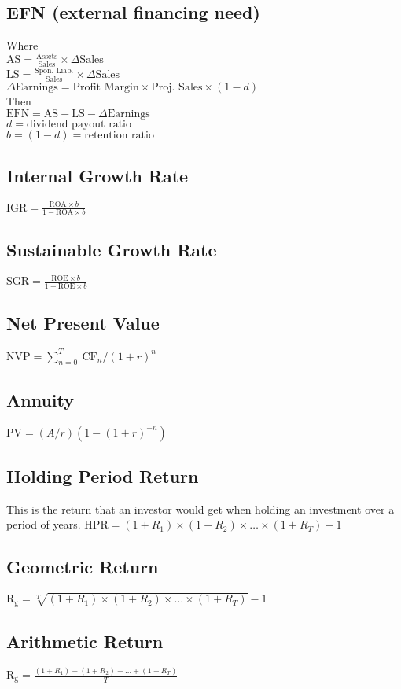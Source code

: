 \subsection{EFN (external financing need)}
Where \\
$\mathrm{AS} = \frac{\mathrm{Assets}}{\mathrm{Sales}}\times\Delta\mathrm{Sales}$ \\
$\mathrm{LS} = \frac{\text{Spon. Liab.}}{\mathrm{Sales}}\times\Delta\mathrm{Sales}$ \\
$\Delta\mathrm{Earnings} = \text{Profit Margin}\times\text{Proj. Sales}\times\left(1 - d\right)$ \\
Then \\
$\mathrm{EFN} = \mathrm{AS} - \mathrm{LS} - \Delta\mathrm{Earnings}$ \\
$d = \text{dividend payout ratio}$ \\
$b = (1 - d) = \text{retention ratio}$ \\

\subsection{Internal Growth Rate}
$\mathrm{IGR} = \frac{\mathrm{ROA}\times b}{1-\mathrm{ROA}\times b}$
\subsection{Sustainable Growth Rate}
$\mathrm{SGR} = \frac{\mathrm{ROE}\times b}{1-\mathrm{ROE}\times b}$
\subsection{Net Present Value}
$\mathrm{NVP} = \sum_{n=0}^T~\text{CF}_n/(1+r)^n$
\subsection{Annuity}
$\mathrm{PV} = (A/r)(1-(1+r)^{-n})$
\subsection{Holding Period Return}
This is the return that an investor would get when holding an investment over a period of years.
$\mathrm{HPR} = (1+R_1)\times(1+R_2)\times\dots\times(1+R_T) - 1$
\subsection{Geometric Return}
$\mathrm{R_g} = \sqrt[T]{(1+R_1)\times(1+R_2)\times\dots\times(1+R_T)} - 1$
\subsection{Arithmetic Return}
$\mathrm{R_g} = \frac{(1+R_1)+(1+R_2)+\dots+(1+R_T)}{T}$